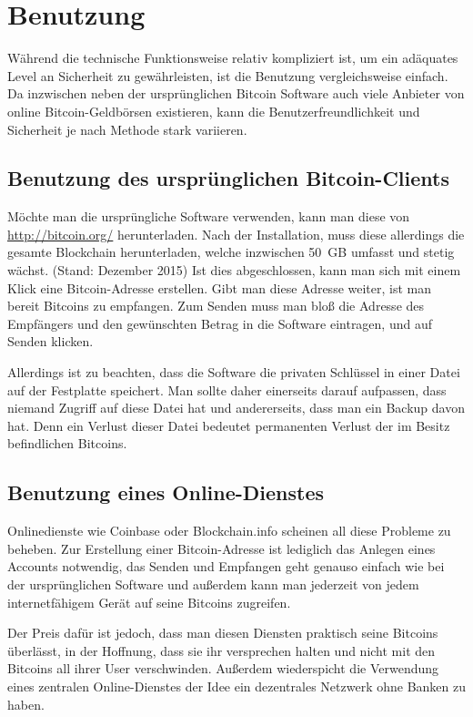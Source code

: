 \section{Benutzung}

Während die technische Funktionsweise relativ kompliziert ist, um ein adäquates Level an Sicherheit zu gewährleisten, ist die Benutzung vergleichsweise einfach.
Da inzwischen neben der ursprünglichen Bitcoin Software auch viele Anbieter von online Bitcoin-Geldbörsen existieren, kann die Benutzerfreundlichkeit und Sicherheit je nach Methode stark variieren.

\subsection{Benutzung des ursprünglichen Bitcoin-Clients}

Möchte man die ursprüngliche Software verwenden, kann man diese von \url{http://bitcoin.org/} herunterladen.
Nach der Installation, muss diese allerdings die gesamte Blockchain herunterladen, welche inzwischen 50~GB umfasst und stetig wächst. (Stand: Dezember 2015)
Ist dies abgeschlossen, kann man sich mit einem Klick eine Bitcoin-Adresse erstellen.
Gibt man diese Adresse weiter, ist man bereit Bitcoins zu empfangen.
Zum Senden muss man bloß die Adresse des Empfängers und den gewünschten Betrag in die Software eintragen, und auf Senden klicken.

Allerdings ist zu beachten, dass die Software die privaten Schlüssel in einer Datei auf der Festplatte speichert.
Man sollte daher einerseits darauf aufpassen, dass niemand Zugriff auf diese Datei hat und andererseits, dass man ein Backup davon hat.
Denn ein Verlust dieser Datei bedeutet permanenten Verlust der im Besitz befindlichen Bitcoins.

\subsection{Benutzung eines Online-Dienstes}

Onlinedienste wie Coinbase oder Blockchain.info scheinen all diese Probleme zu beheben.
Zur Erstellung einer Bitcoin-Adresse ist lediglich das Anlegen eines Accounts notwendig, das Senden und Empfangen geht genauso einfach wie bei der ursprünglichen Software und außerdem kann man jederzeit von jedem internetfähigem Gerät auf seine Bitcoins zugreifen.

Der Preis dafür ist jedoch, dass man diesen Diensten praktisch seine Bitcoins überlässt, in der Hoffnung, dass sie ihr versprechen halten und nicht mit den Bitcoins all ihrer User verschwinden.
Außerdem wiederspicht die Verwendung eines zentralen Online-Dienstes der Idee ein dezentrales Netzwerk ohne Banken zu haben.
